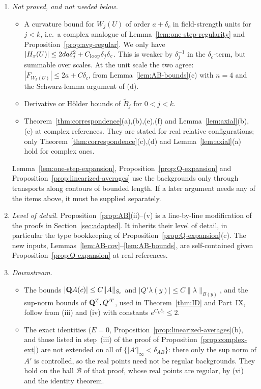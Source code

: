 \begin{remark}\label{rem:AB-remains}
\begin{enumerate}[label=(\arabic*)]
\item \emph{Not proved, and not needed below.}
  \begin{itemize}
  \item A curvature bound for $W_j(U)$ of order $a+\delta_c$ in field-strength units for $j<k$, i.e.\ a complex analogue of Lemma~\ref{lem:one-step-regularity} and Proposition~\ref{prop:avg-regular}. We only have $|H_x(U)|\le2da\delta_j^2+C_{\rm loop}\delta_j\delta_c$. This is weaker by $\delta_j^{-1}$ in the $\delta_c$-term, but summable over scales. At the unit scale the two agree: $|F_{W_k(U)}|\le2a+C\delta_c$, from Lemma~\ref{lem:AB-bounds}(c) with $n=4$ and the Schwarz-lemma argument of (d).
  \item Derivative or H\"older bounds of $\tilde B_j$ for $0<j<k$.
  \item Theorem~\ref{thm:correspondence}(a),(b),(e),(f) and Lemma~\ref{lem:axial}(b),(c) at complex references. They are stated for real relative configurations; only Theorem~\ref{thm:correspondence}(c),(d) and Lemma~\ref{lem:axial}(a) hold for complex ones.
  \end{itemize}
  Lemma~\ref{lem:one-step-expansion}, Proposition~\ref{prop:Q-expansion} and Proposition~\ref{prop:linearized-averages} use the backgrounds only through transports along contours of bounded length. If a later argument needs any of the items above, it must be supplied separately.
\item \emph{Level of detail.} Proposition~\ref{prop:AB}(ii)--(v) is a line-by-line modification of the proofs in Section~\ref{sec:adapted}. It inherits their level of detail, in particular the type bookkeeping of Proposition~\ref{prop:Q-expansion}(c). The new inputs, Lemmas~\ref{lem:AB-cov}--\ref{lem:AB-bounds}, are self-contained given Proposition~\ref{prop:Q-expansion} at real references.
\item \emph{Downstream.}
  \begin{itemize}
  \item The bounds $|\mathbf Q A(c)|\le C\|A\|_{S_c}$ and $|Q'\lambda(y)|\le C\|\lambda\|_{B(y)}$, and the sup-norm bounds of $\mathbf Q^T,Q'^T$, used in Theorem~\ref{thm:ID} and Part~IX, follow from (iii) and (iv) with constants $e^{C_L\delta_c}\le2$.
  \item The exact identities ($E=0$, Proposition~\ref{prop:linearized-averages}(b), and those listed in step~(iii) of the proof of Proposition~\ref{prop:complex-ext}) are not extended on all of $\{|A'|_\infty<\delta_{AB}\}$: there only the sup norm of $A'$ is controlled, so the real points need not be regular backgrounds. They hold on the ball $\mathcal B$ of that proof, whose real points are regular, by (vi) and the identity theorem.
  \end{itemize}
\end{enumerate}
\end{remark}

